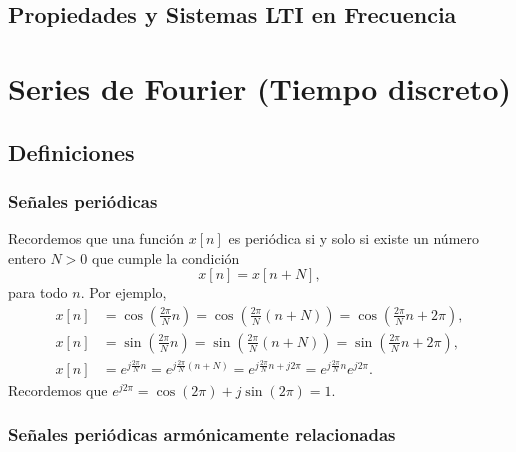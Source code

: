 \documentclass[11pt,a4paper,openany]{book}
\begin{document}
\section{Propiedades y Sistemas LTI en Frecuencia}



\chapter{Series de Fourier (Tiempo discreto)}

\section{Definiciones}

\subsection{Señales periódicas}

Recordemos que una función $x[n]$ es periódica si y solo si existe un número entero $N > 0$ que cumple la condición
\begin{equation}
	x[n] = x[n+N],
\end{equation}
para todo $n$. Por ejemplo, 
\begin{align}
	x[n] &= \cos \left(\frac{2\pi}{N} n\right) = \cos\left(\frac{2\pi}{N} (n + N)\right) = \cos \left(\frac{2\pi}{N} n + 2\pi\right),\\
	x[n] &= \sin \left(\frac{2\pi}{N} n\right) = \sin\left(\frac{2\pi}{N} (n+N)\right) = \sin \left(\frac{2\pi}{N} n + 2\pi\right), \\
	x[n] &= e^{j\frac{2\pi}{N} n} = e^{j\frac{2\pi}{N} (n + N)} = e^{j\frac{2\pi}{N}n + j2\pi} = e^{j\frac{2\pi}{N}n} e^{j2\pi}.
\end{align}
Recordemos que $e^{j2\pi} = \cos(2\pi) + j\sin(2\pi) = 1$.

\subsection{Señales periódicas armónicamente relacionadas}
\end{document}

